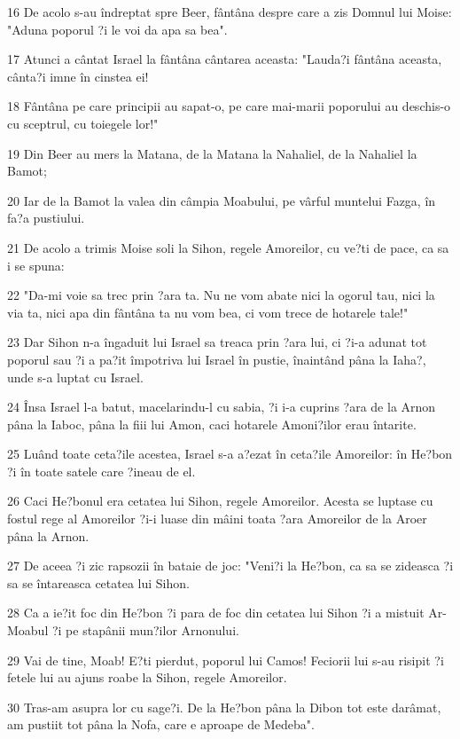 \par 16 De acolo s-au îndreptat spre Beer, fântâna despre care a zis Domnul lui Moise: "Aduna poporul ?i le voi da apa sa bea".
\par 17 Atunci a cântat Israel la fântâna cântarea aceasta: "Lauda?i fântâna aceasta, cânta?i imne în cinstea ei!
\par 18 Fântâna pe care principii au sapat-o, pe care mai-marii poporului au deschis-o cu sceptrul, cu toiegele lor!"
\par 19 Din Beer au mers la Matana, de la Matana la Nahaliel, de la Nahaliel la Bamot;
\par 20 Iar de la Bamot la valea din câmpia Moabului, pe vârful muntelui Fazga, în fa?a pustiului.
\par 21 De acolo a trimis Moise soli la Sihon, regele Amoreilor, cu ve?ti de pace, ca sa i se spuna:
\par 22 "Da-mi voie sa trec prin ?ara ta. Nu ne vom abate nici la ogorul tau, nici la via ta, nici apa din fântâna ta nu vom bea, ci vom trece de hotarele tale!"
\par 23 Dar Sihon n-a îngaduit lui Israel sa treaca prin ?ara lui, ci ?i-a adunat tot poporul sau ?i a pa?it împotriva lui Israel în pustie, înaintând pâna la Iaha?, unde s-a luptat cu Israel.
\par 24 Însa Israel l-a batut, macelarindu-l cu sabia, ?i i-a cuprins ?ara de la Arnon pâna la Iaboc, pâna la fiii lui Amon, caci hotarele Amoni?ilor erau întarite.
\par 25 Luând toate ceta?ile acestea, Israel s-a a?ezat în ceta?ile Amoreilor: în He?bon ?i în toate satele care ?ineau de el.
\par 26 Caci He?bonul era cetatea lui Sihon, regele Amoreilor. Acesta se luptase cu fostul rege al Amoreilor ?i-i luase din mâini toata ?ara Amoreilor de la Aroer pâna la Arnon.
\par 27 De aceea ?i zic rapsozii în bataie de joc: "Veni?i la He?bon, ca sa se zideasca ?i sa se întareasca cetatea lui Sihon.
\par 28 Ca a ie?it foc din He?bon ?i para de foc din cetatea lui Sihon ?i a mistuit Ar-Moabul ?i pe stapânii mun?ilor Arnonului.
\par 29 Vai de tine, Moab! E?ti pierdut, poporul lui Camos! Feciorii lui s-au risipit ?i fetele lui au ajuns roabe la Sihon, regele Amoreilor.
\par 30 Tras-am asupra lor cu sage?i. De la He?bon pâna la Dibon tot este darâmat, am pustiit tot pâna la Nofa, care e aproape de Medeba".
